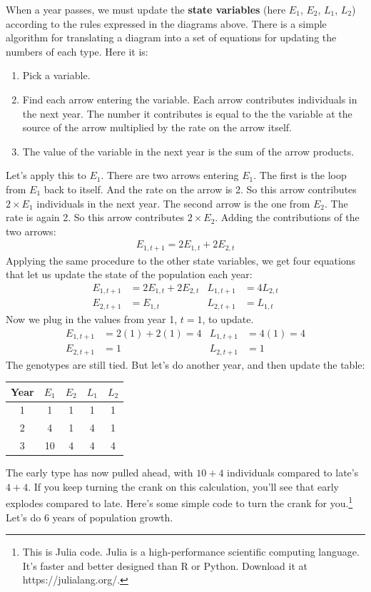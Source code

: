 \documentclass[10pt,reqno]{amsbook}
\newcommand{\bemph}[1]{{\textbf{\textcolor{bemphcol}{#1}}}}
\numberwithin{equation}{chapter}
\begin{document}
When a year passes, we must update the \bemph{state variables} (here $E_1$, $E_2$, $L_1$, $L_2$) according to the rules expressed in the diagrams above. There is a simple algorithm for translating a diagram into a set of equations for updating the numbers of each type. Here it is:
\begin{enumerate}
\item Pick a variable. 
\item Find each arrow entering the variable. Each arrow contributes individuals in the next year. The number it contributes is equal to the the variable at the source of the arrow multiplied by the rate on the arrow itself.
\item The value of the variable in the next year is the sum of the arrow products.
\end{enumerate}
Let's apply this to $E_1$. There are two arrows entering $E_1$. The first is the loop from $E_1$ back to itself. And the rate on the arrow is 2. So this arrow contributes $2\times E_1$ individuals in the next year. The second arrow is the one from $E_2$. The rate is again 2. So this arrow contributes $2\times E_2$. Adding the contributions of the two arrows:
\begin{align*}
	E_{1,t+1} = 2 E_{1,t} + 2 E_{2,t}
\end{align*}
Applying the same procedure to the other state variables, we get four equations that let us update the state of the population each year:
\begin{align*}
	E_{1,t+1} &= 2 E_{1,t} + 2 E_{2,t}  &  
	L_{1,t+1} &= 4 L_{2,t} \\
	E_{2,t+1} &= E_{1,t}  &
	L_{2,t+1} &= L_{1,t}
\end{align*}
Now we plug in the values from year 1, $t=1$, to update.
\begin{align*}
	E_{1,t+1} &= 2 (1) + 2 (1) = 4  &  
	L_{1,t+1} &= 4 (1) = 4 \\
	E_{2,t+1} &= 1  &
	L_{2,t+1} &= 1
\end{align*}
The genotypes are still tied. But let's do another year, and then update the table: 
\begin{center}
\begin{tabular}{ccccc}
Year & $E_1$ & $E_2$ & $L_1$ & $L_2$\\
\hline
1 & 1 & 1 & 1 & 1\\
2 & 4 & 1 & 4 & 1\\
3 & 10 & 4 & 4 & 4
\end{tabular}
\end{center}
The early type has now pulled ahead, with $10+4$ individuals compared to late's $4+4$. If you keep turning the crank on this calculation, you'll see that early explodes compared to late. Here's some simple code to turn the crank for you.\footnote{This is Julia code. Julia is a high-performance scientific computing language. It's faster and better designed than R or Python. Download it at https://julialang.org/.} Let's do 6 years of population growth.
\end{document}
